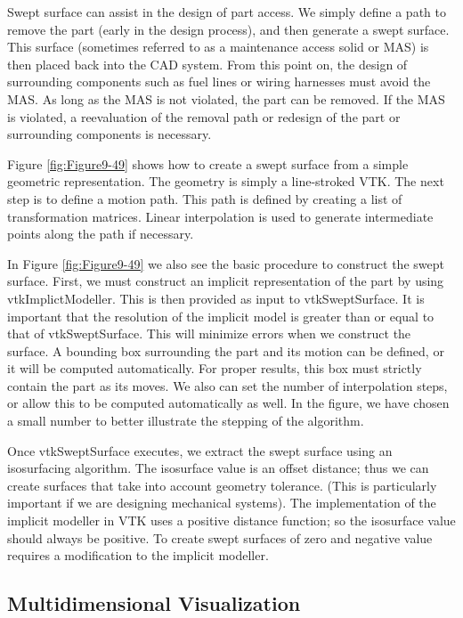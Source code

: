 Swept surface can assist in the design of part access. We simply define a path to remove the part (early in the design process), and then generate a swept surface. This surface (sometimes referred to as a maintenance access solid or MAS) is then placed back into the CAD system. From this point on, the design of surrounding components such as fuel lines or wiring harnesses must avoid the MAS. As long as the MAS is not violated, the part can be removed. If the MAS is violated, a reevaluation of the removal path or redesign of the part or surrounding components is necessary.

Figure \ref{fig:Figure9-49} shows how to create a swept surface from a simple geometric representation. The geometry is simply a line-stroked VTK. The next step is to define a motion path. This path is defined by creating a list of transformation matrices. Linear interpolation is used to generate intermediate points along the path if necessary.

In Figure \ref{fig:Figure9-49} we also see the basic procedure to construct the swept surface. First, we must construct an implicit representation of the part by using vtkImplictModeller. This is then provided as input to vtkSweptSurface. It is important that the resolution of the implicit model is greater than or equal to that of vtkSweptSurface. This will minimize errors when we construct the surface. A bounding box surrounding the part and its motion can be defined, or it will be computed automatically. For proper results, this box must strictly contain the part as its moves. We also can set the number of interpolation steps, or allow this to be computed automatically as well. In the figure, we have chosen a small number to better illustrate the stepping of the algorithm.

Once vtkSweptSurface executes, we extract the swept surface using an isosurfacing algorithm. The isosurface value is an offset distance; thus we can create surfaces that take into account geometry tolerance. (This is particularly important if we are designing mechanical systems). The implementation of the implicit modeller in VTK uses a positive distance function; so the isosurface value should always be positive. To create swept surfaces of zero and negative value requires a modification to the implicit modeller.

\subsection{Multidimensional Visualization}

